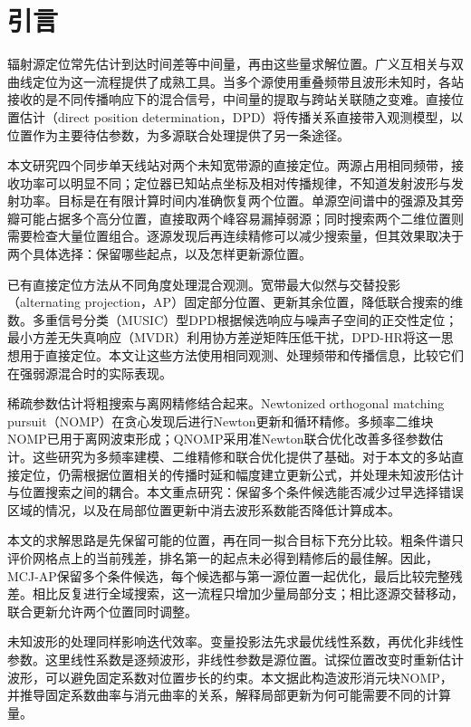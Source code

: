 \section{引言}\label{sec:introduction}
辐射源定位常先估计到达时间差等中间量，再由这些量求解位置。广义互相关与双曲线定位为这一流程提供了成熟工具\cite{KnappCarter1976,ChanHo1994}。当多个源使用重叠频带且波形未知时，各站接收的是不同传播响应下的混合信号，中间量的提取与跨站关联随之变难。直接位置估计（direct position determination，DPD）将传播关系直接带入观测模型，以位置作为主要待估参数，为多源联合处理提供了另一条途径\cite{ChenHudsonYao2002,WeissAmar2005}。

本文研究四个同步单天线站对两个未知宽带源的直接定位。两源占用相同频带，接收功率可以明显不同；定位器已知站点坐标及相对传播规律，不知道发射波形与发射功率。目标是在有限计算时间内准确恢复两个位置。单源空间谱中的强源及其旁瓣可能占据多个高分位置，直接取两个峰容易漏掉弱源；同时搜索两个二维位置则需要检查大量位置组合。逐源发现后再连续精修可以减少搜索量，但其效果取决于两个具体选择：保留哪些起点，以及怎样更新源位置。

已有直接定位方法从不同角度处理混合观测。宽带最大似然与交替投影（alternating projection，AP）固定部分位置、更新其余位置，降低联合搜索的维数\cite{ChenHudsonYao2002}。多重信号分类（MUSIC）型DPD根据候选响应与噪声子空间的正交性定位\cite{WeissAmar2005}；最小方差无失真响应（MVDR）利用协方差逆矩阵压低干扰\cite{Capon1969}，DPD-HR将这一思想用于直接定位\cite{TirerWeiss2016}。本文让这些方法使用相同观测、处理频带和传播信息，比较它们在强弱源混合时的实际表现。

稀疏参数估计将粗搜索与离网精修结合起来。Newtonized orthogonal matching pursuit（NOMP）在贪心发现后进行Newton更新和循环精修\cite{Mamandipoor2016}。多频率二维块NOMP已用于离网波束形成\cite{Yang2022}；QNOMP采用准Newton联合优化改善多径参数估计\cite{Zeng2025}。这些研究为多频率建模、二维精修和联合优化提供了基础。对于本文的多站直接定位，仍需根据位置相关的传播时延和幅度建立更新公式，并处理未知波形估计与位置搜索之间的耦合。本文重点研究：保留多个条件候选能否减少过早选择错误区域的情况，以及在局部位置更新中消去波形系数能否降低计算成本。

本文的求解思路是先保留可能的位置，再在同一拟合目标下充分比较。粗条件谱只评价网格点上的当前残差，排名第一的起点未必得到精修后的最佳解。因此，MCJ-AP保留多个条件候选，每个候选都与第一源位置一起优化，最后比较完整残差。相比反复进行全域搜索，这一流程只增加少量局部分支；相比逐源交替移动，联合更新允许两个位置同时调整。

未知波形的处理同样影响迭代效率。变量投影法先求最优线性系数，再优化非线性参数\cite{GolubPereyra1973}。这里线性系数是逐频波形，非线性参数是源位置。试探位置改变时重新估计波形，可以避免固定系数对位置步长的约束。本文据此构造波形消元块NOMP，并推导固定系数曲率与消元曲率的关系，解释局部更新为何可能需要不同的计算量。

